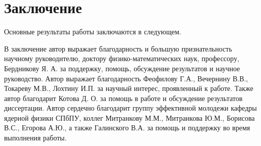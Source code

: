 \chapter*{Заключение}                       %


Основные результаты работы заключаются в следующем.



В заключение автор выражает благодарность и большую признательность научному руководителю, доктору физико-математических наук, профессору, Бердникову Я. А. за поддержку, помощь, обсуждение результатов и научное руководство. Автор выражает благодарность Феофилову Г.А., Вечернину В.В., Токареву М.В., Лохтину И.П. за научный интерес, проявленный к работе. Так­же автор благодарит Котова Д. О. за помощь в работе и обсуждение результатов диссертации. Автор сердечно благодарит группу эффективной молодежи кафедры ядерной физики СПбПУ, коллег Митранкову М.М., Митранкова Ю.М., Борисова В.С., Егорова А.Ю., а также Галинского В.А. за помощь и поддержку во время выполнения работы.

